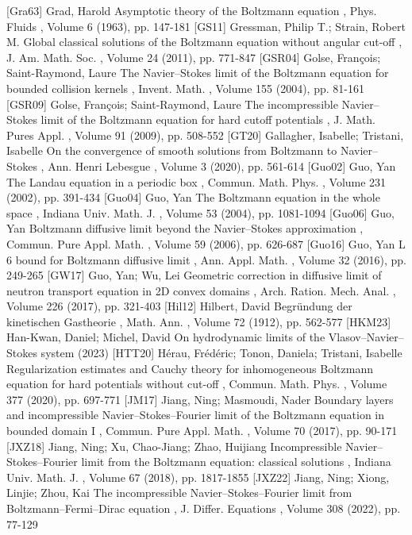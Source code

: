  [Gra63] Grad, Harold Asymptotic theory of the Boltzmann equation , Phys. Fluids , Volume 6 (1963), pp. 147-181
 [GS11] Gressman, Philip T.; Strain, Robert M. Global classical solutions of the Boltzmann equation without angular cut-off , J. Am. Math. Soc. , Volume 24 (2011), pp. 771-847
 [GSR04] Golse, François; Saint-Raymond, Laure The Navier–Stokes limit of the Boltzmann equation for bounded collision kernels , Invent. Math. , Volume 155 (2004), pp. 81-161
 [GSR09] Golse, François; Saint-Raymond, Laure The incompressible Navier–Stokes limit of the Boltzmann equation for hard cutoff potentials , J. Math. Pures Appl. , Volume 91 (2009), pp. 508-552
 [GT20] Gallagher, Isabelle; Tristani, Isabelle On the convergence of smooth solutions from Boltzmann to Navier–Stokes , Ann. Henri Lebesgue , Volume 3 (2020), pp. 561-614
 [Guo02] Guo, Yan The Landau equation in a periodic box , Commun. Math. Phys. , Volume 231 (2002), pp. 391-434
 [Guo04] Guo, Yan The Boltzmann equation in the whole space , Indiana Univ. Math. J. , Volume 53 (2004), pp. 1081-1094
 [Guo06] Guo, Yan Boltzmann diffusive limit beyond the Navier–Stokes approximation , Commun. Pure Appl. Math. , Volume 59 (2006), pp. 626-687
 [Guo16] Guo, Yan L 6 bound for Boltzmann diffusive limit , Ann. Appl. Math. , Volume 32 (2016), pp. 249-265
 [GW17] Guo, Yan; Wu, Lei Geometric correction in diffusive limit of neutron transport equation in 2D convex domains , Arch. Ration. Mech. Anal. , Volume 226 (2017), pp. 321-403
 [Hil12] Hilbert, David Begründung der kinetischen Gastheorie , Math. Ann. , Volume 72 (1912), pp. 562-577
 [HKM23] Han-Kwan, Daniel; Michel, David On hydrodynamic limits of the Vlasov–Navier–Stokes system (2023)
 [HTT20] Hérau, Frédéric; Tonon, Daniela; Tristani, Isabelle Regularization estimates and Cauchy theory for inhomogeneous Boltzmann equation for hard potentials without cut-off , Commun. Math. Phys. , Volume 377 (2020), pp. 697-771
 [JM17] Jiang, Ning; Masmoudi, Nader Boundary layers and incompressible Navier–Stokes–Fourier limit of the Boltzmann equation in bounded domain I , Commun. Pure Appl. Math. , Volume 70 (2017), pp. 90-171
 [JXZ18] Jiang, Ning; Xu, Chao-Jiang; Zhao, Huijiang Incompressible Navier–Stokes–Fourier limit from the Boltzmann equation: classical solutions , Indiana Univ. Math. J. , Volume 67 (2018), pp. 1817-1855
 [JXZ22] Jiang, Ning; Xiong, Linjie; Zhou, Kai The incompressible Navier–Stokes–Fourier limit from Boltzmann–Fermi–Dirac equation , J. Differ. Equations , Volume 308 (2022), pp. 77-129
